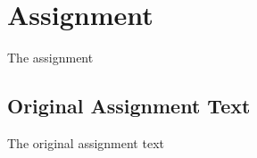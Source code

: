 \section{Assignment}
The assignment
\subsection{Original Assignment Text}
The original assignment text